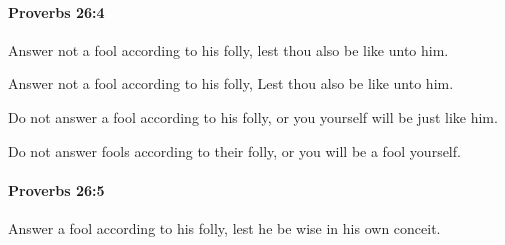		\paragraph{Proverbs 26:4} %
			\label{PROVERBS-26-4}

			Answer not a fool according to his folly, lest thou also be like unto him.

			\begin{versebox}
					\item[BHS] 
					\item[ASV] Answer not a fool according to his folly, Lest thou also be like unto him.
					\item[NIV] Do not answer a fool according to his folly, or you yourself will be just like him.
					\item[NRSV] Do not answer fools according to their folly, or you will be a fool yourself.
			\end{versebox}

		\paragraph{Proverbs 26:5} %
			\label{PROVERBS-26-5}

			Answer a fool according to his folly, lest he be wise in his own conceit.

